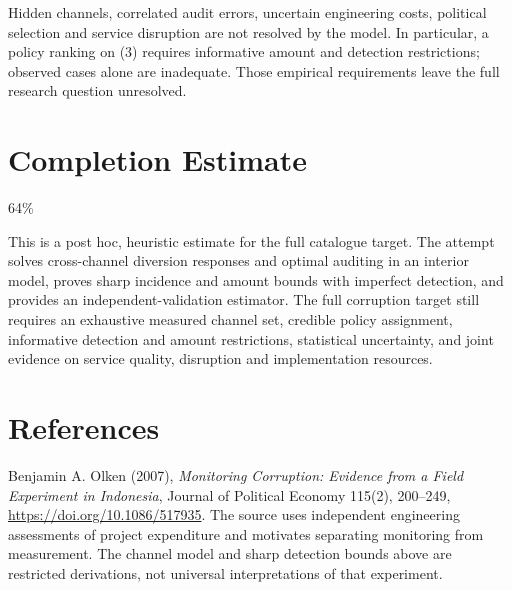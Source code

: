 \documentclass[11pt,a4paper]{article}
\theoremstyle{definition}
\theoremstyle{remark}
\begin{document}
Hidden channels, correlated audit errors, uncertain engineering costs, political selection and service disruption are not resolved by the model. In particular, a policy ranking on (3) requires informative amount and detection restrictions; observed cases alone are inadequate. Those empirical requirements leave the full research question unresolved.

\section{Completion Estimate}
64\%

This is a post hoc, heuristic estimate for the full catalogue target.
The attempt solves cross-channel diversion responses and optimal auditing in an interior model, proves sharp incidence and amount bounds with imperfect detection, and provides an independent-validation estimator. The full corruption target still requires an exhaustive measured channel set, credible policy assignment, informative detection and amount restrictions, statistical uncertainty, and joint evidence on service quality, disruption and implementation resources.

\section*{References}
Benjamin A. Olken (2007), \emph{Monitoring Corruption: Evidence from a Field Experiment in Indonesia}, Journal of Political Economy 115(2), 200--249, \url{https://doi.org/10.1086/517935}. The source uses independent engineering assessments of project expenditure and motivates separating monitoring from measurement. The channel model and sharp detection bounds above are restricted derivations, not universal interpretations of that experiment.
\end{document}
